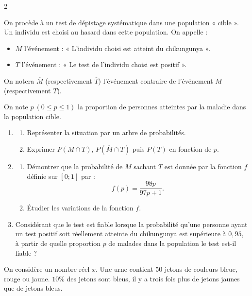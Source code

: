 \documentclass[a4paper,12pt]{article}
\begin{document}
\begin{multicols}{2}
\begin{exercice}[title=Exercice 33 $\quad \star \star \quad$ { [Calculer, Modéliser] }]{}{}
On procède à un test de dépistage systématique dans une population « cible ». Un individu est choisi au hasard dans cette population. On appelle :
\begin{itemize}[noitemsep, topsep=0pt]
    \item $M$ l’événement : « L’individu choisi est atteint du chikungunya ».
    \item $T$ l’événement : « Le test de l’individu choisi est positif ».
\end{itemize}

On notera $\overline{M}$ (respectivement $\overline{T}$) l’événement contraire de l’événement $M$ (respectivement $T$).

On note $p \ (0 \leq p \leq 1)$ la proportion de personnes atteintes par la maladie dans la population cible.
\begin{enumerate}
  \item \begin{enumerate}
    \item Représenter la situation par un arbre de probabilités.
    \item Exprimer $P(M \cap T)$, $P(\overline{M} \cap T)$ puis $P(T)$ en fonction de $p$.
  \end{enumerate}
  \item \begin{enumerate}
    \item Démontrer que la probabilité de $M$ sachant $T$ est donnée par la fonction $f$ définie sur $[0; 1]$ par :
    \[
    f(p) = \dfrac{98p}{97p + 1}.
    \]
    \item Étudier les variations de la fonction $f$.
  \end{enumerate}
  \item Considérant que le test est fiable lorsque la probabilité qu’une personne ayant un test positif soit réellement atteinte du chikungunya est supérieure à $0,95$, à partir de quelle proportion $p$ de malades dans la population le test est-il fiable ?
\end{enumerate}
\end{exercice}

\vfill

\begin{exercice}[title=Exercice 34 $\quad \star \star \star \quad$ { [Calculer, Modéliser, Chercher] }]{}{}
On considère un nombre réel $x$. Une urne contient $50$ jetons de couleurs bleue, rouge ou jaune. $10\%$ des jetons sont bleus, il y a trois fois plus de jetons jaunes que de jetons bleus. 


\end{exercice}
\end{multicols}
\end{document}
